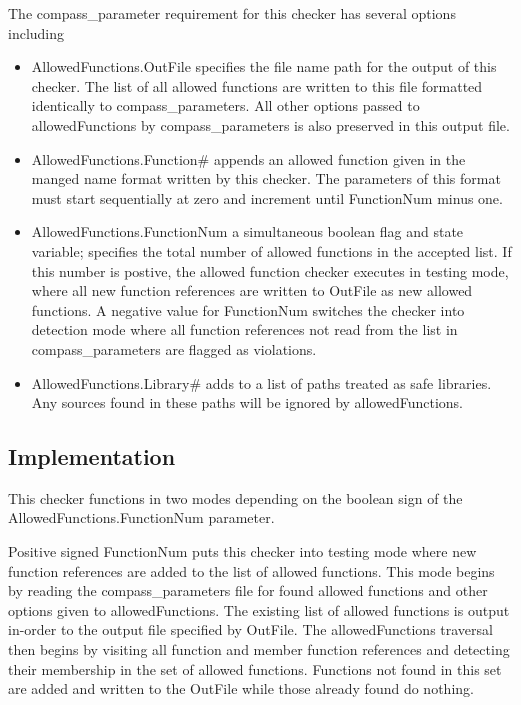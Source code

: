 The compass\_parameter requirement for this checker has several options
including
%
\begin{itemize}
\item AllowedFunctions.OutFile specifies the file name path for the output of
	this checker. The list of all allowed functions are written to this
	file formatted identically to compass\_parameters. All other options
	passed to allowedFunctions by compass\_parameters is also preserved 
	in this output file.
\item AllowedFunctions.Function\# appends an allowed function given in the
	manged name format written by this checker. The parameters of this
	format must start sequentially at zero and increment until
	FunctionNum minus one.
\item AllowedFunctions.FunctionNum a simultaneous boolean flag and state
	variable; specifies the total number of allowed functions in the
	accepted list. If this number is postive, the allowed function checker
	executes in testing mode, where all new function references are written
	to OutFile as new allowed functions. A negative value for FunctionNum
	switches the checker into detection mode where all function references
	not read from the list in compass\_parameters are flagged as 
	violations.
\item AllowedFunctions.Library\# adds to a list of paths treated as safe
	libraries. Any sources found in these paths will be ignored by 
	allowedFunctions.
\end{itemize}

\subsection{Implementation}

This checker functions in two modes depending on the boolean sign of the
AllowedFunctions.FunctionNum parameter. 

Positive signed FunctionNum puts 
this checker into testing mode where new function references are added to
the list of allowed functions. This mode begins by reading the 
compass\_parameters file for found allowed functions and other options
given to allowedFunctions. The existing list of allowed functions is output
in-order to the output file specified by OutFile. The allowedFunctions
traversal then begins by visiting all function and member function references
and detecting their membership in the set of allowed functions. Functions
not found in this set are added and written to the OutFile while those already 
found do nothing. 

